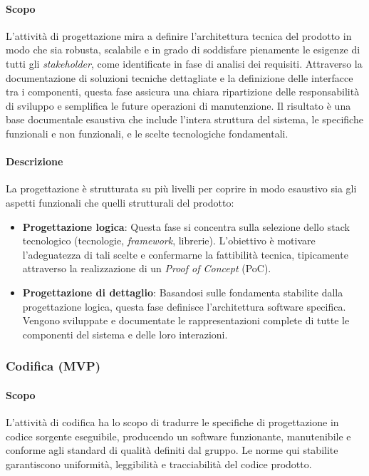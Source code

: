 \documentclass[a4paper, 11pt, oneside]{scrartcl} %
\begin{document}
\paragraph{Scopo} L'attività di progettazione mira a definire l'architettura 
tecnica del prodotto in modo che sia robusta, scalabile e in grado di 
soddisfare pienamente le esigenze di tutti gli \textit{stakeholder}, 
come identificate in fase di analisi dei requisiti. 
Attraverso la documentazione di soluzioni tecniche dettagliate e la 
definizione delle interfacce tra i componenti, questa fase assicura una 
chiara ripartizione delle responsabilità di sviluppo e semplifica le 
future operazioni di manutenzione. 
Il risultato è una base documentale esaustiva che include l'intera 
struttura del sistema, le specifiche funzionali{\scriptsize{}} e non funzionali, 
e le scelte tecnologiche fondamentali.

\paragraph{Descrizione} La progettazione è strutturata su più livelli per coprire in modo esaustivo sia gli aspetti funzionali che quelli strutturali del prodotto:

\begin{itemize}
    \item \textbf{Progettazione logica}: Questa fase si concentra sulla selezione dello stack tecnologico (tecnologie, \textit{framework}, librerie). L'obiettivo è motivare l'adeguatezza di tali scelte e confermarne la fattibilità tecnica, tipicamente attraverso la realizzazione di un \textit{Proof of Concept{\scriptsize{}}} (PoC).
    
    \item \textbf{Progettazione di dettaglio}: Basandosi sulle fondamenta stabilite dalla progettazione logica, questa fase definisce l'architettura software specifica. Vengono sviluppate e documentate le rappresentazioni complete di tutte le componenti del sistema e delle loro interazioni.
\end{itemize}

\subsubsection{Codifica (MVP)}

\paragraph{Scopo}
L'attività di codifica ha lo scopo di tradurre le specifiche di progettazione in codice sorgente eseguibile, producendo un software funzionante, manutenibile e conforme agli standard di qualità definiti dal gruppo.
Le norme qui stabilite garantiscono uniformità, leggibilità e tracciabilità del codice prodotto.
\end{document}
